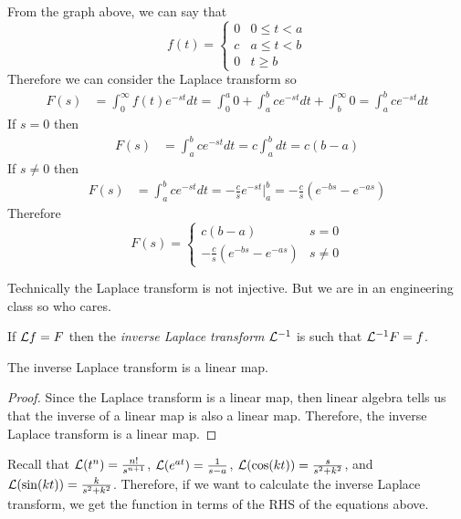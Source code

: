 \documentclass[notes]{subfiles}
\begin{document}
\begin{solution}
    From the graph above, we can say that
    \[
        f(t) = \begin{cases}
            0 & 0 \leq t < a \\
            c & a \leq t < b \\
            0 & t \geq b
        \end{cases}
    \]
    Therefore we can consider the Laplace transform so
    \begin{align*}
        F(s)
        &= \int_0^\infty f(t)e^{-st}dt
        = \int_0^a 0 + \int_a^b ce^{-st}dt + \int_b^\infty 0
        = \int_a^b ce^{-st}dt
    \end{align*}
    If $s = 0$ then
    \begin{align*}
        F(s)
        &= \int_a^b ce^{-st}dt
        = c\int_a^b dt
        = c(b - a)
    \end{align*}
    If $s \neq 0$ then
    \begin{align*}
        F(s)
        &= \int_a^b ce^{-st}dt
        = -\frac{c}{s}e^{-st}\Big|_a^b
        = -\frac{c}{s}(e^{-bs} - e^{-as})
    \end{align*}
    Therefore
    \[
        F(s) = \begin{cases}
            c(b - a) & s = 0 \\
            -\frac{c}{s}(e^{-bs} - e^{-as}) & s \neq 0
        \end{cases}
    \]
\end{solution}

Technically the Laplace transform is not injective. But we are in an engineering class so who cares.
\begin{definition}
    If $\mathcal{L} f = F$ then the \textsl{inverse Laplace transform} $\mathcal{L} ^{-1}$ is such that $\mathcal{L} ^{-1}F = f$.
\end{definition}

\begin{lemma}
    The inverse Laplace transform is a linear map.
\end{lemma}
\begin{proof}
    Since the Laplace transform is a linear map, then linear algebra tells us that the inverse of a linear map is also a linear map. Therefore, the inverse Laplace transform is a linear map.
\end{proof}

Recall that $\mathcal{L} (t^n) = \frac{n!}{s^{n + 1}}$, $\mathcal{L} (e^{at}) = \frac{1}{s - a}$, $\mathcal{L} (\cos(kt)) = \frac{s}{s^2 + k^2}$, and $\mathcal{L} (\sin(kt)) = \frac{k}{s^2 + k^2}$. Therefore, if we want to calculate the inverse Laplace transform, we get the function in terms of the RHS of the equations above.
\end{document}
